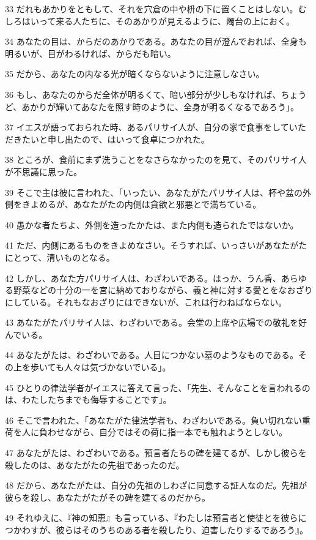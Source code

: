 \par 33 だれもあかりをともして、それを穴倉の中や枡の下に置くことはしない。むしろはいって来る人たちに、そのあかりが見えるように、燭台の上におく。
\par 34 あなたの目は、からだのあかりである。あなたの目が澄んでおれば、全身も明るいが、目がわるければ、からだも暗い。
\par 35 だから、あなたの内なる光が暗くならないように注意しなさい。
\par 36 もし、あなたのからだ全体が明るくて、暗い部分が少しもなければ、ちょうど、あかりが輝いてあなたを照す時のように、全身が明るくなるであろう」。
\par 37 イエスが語っておられた時、あるパリサイ人が、自分の家で食事をしていただきたいと申し出たので、はいって食卓につかれた。
\par 38 ところが、食前にまず洗うことをなさらなかったのを見て、そのパリサイ人が不思議に思った。
\par 39 そこで主は彼に言われた、「いったい、あなたがたパリサイ人は、杯や盆の外側をきよめるが、あなたがたの内側は貪欲と邪悪とで満ちている。
\par 40 愚かな者たちよ、外側を造ったかたは、また内側も造られたではないか。
\par 41 ただ、内側にあるものをきよめなさい。そうすれば、いっさいがあなたがたにとって、清いものとなる。
\par 42 しかし、あなた方パリサイ人は、わざわいである。はっか、うん香、あらゆる野菜などの十分の一を宮に納めておりながら、義と神に対する愛とをなおざりにしている。それもなおざりにはできないが、これは行わねばならない。
\par 43 あなたがたパリサイ人は、わざわいである。会堂の上席や広場での敬礼を好んでいる。
\par 44 あなたがたは、わざわいである。人目につかない墓のようなものである。その上を歩いても人々は気づかないでいる」。
\par 45 ひとりの律法学者がイエスに答えて言った、「先生、そんなことを言われるのは、わたしたちまでも侮辱することです」。
\par 46 そこで言われた、「あなたがた律法学者も、わざわいである。負い切れない重荷を人に負わせながら、自分ではその荷に指一本でも触れようとしない。
\par 47 あなたがたは、わざわいである。預言者たちの碑を建てるが、しかし彼らを殺したのは、あなたがたの先祖であったのだ。
\par 48 だから、あなたがたは、自分の先祖のしわざに同意する証人なのだ。先祖が彼らを殺し、あなたがたがその碑を建てるのだから。
\par 49 それゆえに、『神の知恵』も言っている、『わたしは預言者と使徒とを彼らにつかわすが、彼らはそのうちのある者を殺したり、迫害したりするであろう』。
